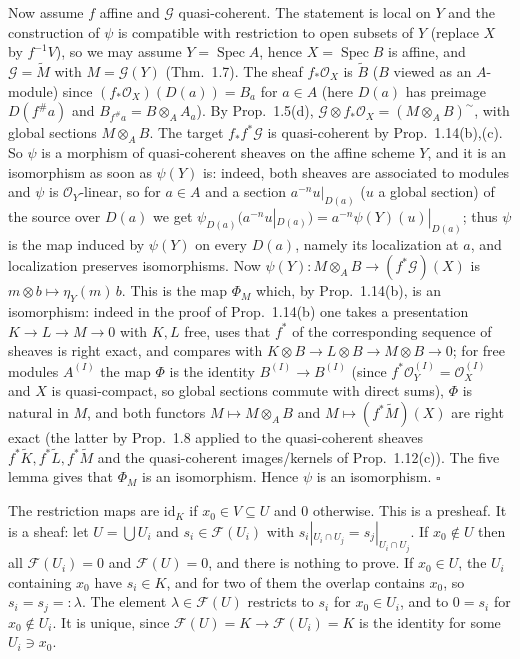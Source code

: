 \documentclass[11pt]{article}
\begin{document}
Now assume $f$ affine and $\mathcal{G}$ quasi-coherent. The statement is local on $Y$ and the construction of $\psi$ is compatible with restriction to open subsets of $Y$ (replace $X$ by $f^{-1}V$), so we may assume $Y=\operatorname{Spec}A$, hence $X=\operatorname{Spec}B$ is affine, and $\mathcal{G}=\widetilde M$ with $M=\mathcal{G}(Y)$ (Thm.~1.7). The sheaf $f_*\mathcal{O}_X$ is $\widetilde B$ ($B$ viewed as an $A$-module) since $(f_*\mathcal{O}_X)(D(a))=B_{a}$ for $a\in A$ (here $D(a)$ has preimage $D(f^\#a)$ and $B_{f^\#a}=B\otimes_AA_a$). By Prop.~1.5(d), $\mathcal{G}\otimes f_*\mathcal{O}_X=(M\otimes_AB)^\sim$, with global sections $M\otimes_AB$. The target $f_*f^*\mathcal{G}$ is quasi-coherent by Prop.~1.14(b),(c). So $\psi$ is a morphism of quasi-coherent sheaves on the affine scheme $Y$, and it is an isomorphism as soon as $\psi(Y)$ is: indeed, both sheaves are associated to modules and $\psi$ is $\mathcal{O}_Y$-linear, so for $a\in A$ and a section $a^{-n}u|_{D(a)}$ ($u$ a global section) of the source over $D(a)$ we get $\psi_{D(a)}(a^{-n}u|_{D(a)})=a^{-n}\psi(Y)(u)|_{D(a)}$; thus $\psi$ is the map induced by $\psi(Y)$ on every $D(a)$, namely its localization at $a$, and localization preserves isomorphisms. Now $\psi(Y):M\otimes_AB\to(f^*\mathcal{G})(X)$ is $m\otimes b\mapsto\eta_Y(m)\,b$. This is the map $\Phi_M$ which, by Prop.~1.14(b), is an isomorphism: indeed in the proof of Prop.~1.14(b) one takes a presentation $K\to L\to M\to0$ with $K,L$ free, uses that $f^*$ of the corresponding sequence of sheaves is right exact, and compares with $K\otimes B\to L\otimes B\to M\otimes B\to0$; for free modules $A^{(I)}$ the map $\Phi$ is the identity $B^{(I)}\to B^{(I)}$ (since $f^*\mathcal{O}_Y^{(I)}=\mathcal{O}_X^{(I)}$ and $X$ is quasi-compact, so global sections commute with direct sums), $\Phi$ is natural in $M$, and both functors $M\mapsto M\otimes_AB$ and $M\mapsto(f^*\widetilde M)(X)$ are right exact (the latter by Prop.~1.8 applied to the quasi-coherent sheaves $f^*\widetilde K,f^*\widetilde L,f^*\widetilde M$ and the quasi-coherent images/kernels of Prop.~1.12(c)). The five lemma gives that $\Phi_M$ is an isomorphism. Hence $\psi$ is an isomorphism. \hfill$\square$

\pf
The restriction maps are $\mathrm{id}_K$ if $x_0\in V\subseteq U$ and $0$ otherwise. This is a presheaf. It is a sheaf: let $U=\bigcup U_i$ and $s_i\in\mathcal{F}(U_i)$ with $s_i|_{U_i\cap U_j}=s_j|_{U_i\cap U_j}$. If $x_0\notin U$ then all $\mathcal{F}(U_i)=0$ and $\mathcal{F}(U)=0$, and there is nothing to prove. If $x_0\in U$, the $U_i$ containing $x_0$ have $s_i\in K$, and for two of them the overlap contains $x_0$, so $s_i=s_j=:\lambda$. The element $\lambda\in\mathcal{F}(U)$ restricts to $s_i$ for $x_0\in U_i$, and to $0=s_i$ for $x_0\notin U_i$. It is unique, since $\mathcal{F}(U)=K\to\mathcal{F}(U_i)=K$ is the identity for some $U_i\ni x_0$.
\end{document}
